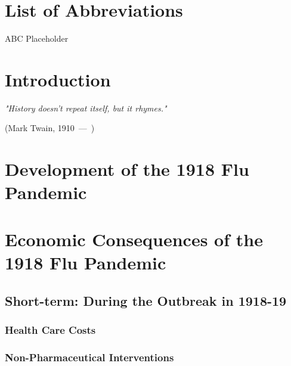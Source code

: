 \documentclass[12pt,a4paper]{article}
\let\oldquote\quote
\let\endoldquote\endquote
\renewenvironment{quote}[2][]
{\if\relax\detokenize{#1}\relax
	\def\quoteauthor{#2}%
	\else
	\def\quoteauthor{#2~---~#1}%
	\fi
	\oldquote}
{\par\nobreak\smallskip\hfill(\quoteauthor)%
	\endoldquote\addvspace{\bigskipamount}}
\begin{document}
\section*{List of Abbreviations}
 
\begin{abbrv}
 
\item[ABC]			Placeholder

 
\end{abbrv}
\newpage
\setcounter{page}{2}
\setlength{\baselineskip}{1.5\baselineskip}
\pagestyle{plain}


\section{Introduction}

\begin{quote}{Mark Twain, 1910}
	\textit{"History doesn't repeat itself, but it rhymes."}
\end{quote}


\section{Development of the 1918 Flu Pandemic}

\section{Economic Consequences of the 1918 Flu Pandemic}
\subsection{Short-term: During the Outbreak in 1918-19}
\subsubsection{Health Care Costs}
\subsubsection{Non-Pharmaceutical Interventions}
\end{document}

